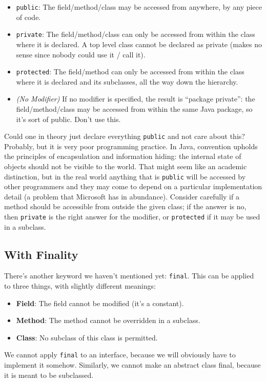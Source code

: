 \begin{itemize}
	\item \texttt{public}: The field/method/class may be accessed from anywhere, by any piece of code.
	\item \texttt{private}: The field/method/class can only be accessed from within the class where it is declared. A top level class cannot be declared as private (makes no sense since nobody could use it / call it).
	\item \texttt{protected}: The field/method can only be accessed from within the class where it is declared and its subclasses, all the way down the hierarchy. 
	\item \textit{(No Modifier)} If no modifier is specified, the result is ``package private'': the field/method/class may be accessed from within the same Java package, so it's sort of public. Don't use this.
\end{itemize}

Could one in theory just declare everything \texttt{public} and not care about this? Probably, but it is very poor programming practice. In Java, convention upholds the principles of encapsulation and information hiding: the internal state of objects should not be visible to the world. That might seem like an academic distinction, but in the real world anything that is \texttt{public} will be accessed by other programmers and they may come to depend on a particular implementation detail (a problem that Microsoft has in abundance). Consider carefully if a method should be accessible from outside the given class; if the answer is no, then \texttt{private} is the right answer for the modifier, or \texttt{protected} if it may be used in a subclass.

\subsection*{With Finality}
There's another keyword we haven't mentioned yet: \texttt{final}. This can be applied to three things, with slightly different meanings:
\begin{itemize}
	\item \textbf{Field}: The field cannot be modified (it's a constant).
	\item \textbf{Method}: The method cannot be overridden in a subclass.
	\item \textbf{Class}: No subclass of this class is permitted.
\end{itemize}

We cannot apply \texttt{final} to an interface, because we will obviously have to implement it somehow. Similarly, we cannot make an abstract class final, because it is meant to be subclassed. 


